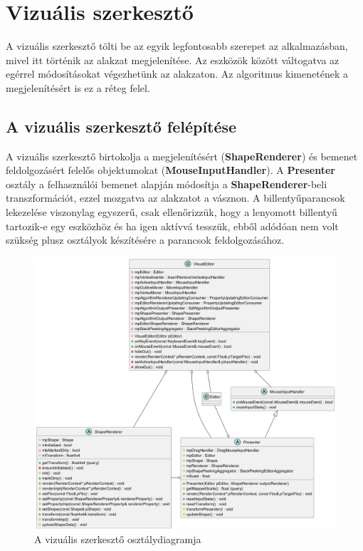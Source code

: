 \section{Vizuális szerkesztő}

A vizuális szerkesztő tölti be az egyik legfontosabb szerepet az alkalmazásban, mivel itt történik az alakzat megjelenítése. Az eszközök között váltogatva az egérrel módosításokat végezhetünk az alakzaton. Az algoritmus kimenetének a megjelenítésért is ez a réteg felel.

\subsection{A vizuális szerkesztő felépítése}

A vizuális szerkesztő birtokolja a megjelenítésért (\textbf{ShapeRenderer}) és bemenet feldolgozásért felelős objektumokat (\textbf{MouseInputHandler}). A \textbf{Presenter} osztály a felhasználói bemenet alapján módosítja a \textbf{ShapeRenderer}-beli transzformációt, ezzel mozgatva az alakzatot a vásznon. A billentyűparancsok lekezelése viszonylag egyszerű, csak ellenőrizzük, hogy a lenyomott billentyű tartozik-e egy eszközhöz és ha igen aktívvá tesszük, ebből adódóan nem volt szükség plusz osztályok készítésére a parancsok feldolgozásához.

\begin{figure}[H]
    \centering
    \includegraphics[width=1\linewidth]{images/class_visual_editor.png}
    \caption{A vizuális szerkesztő osztálydiagramja}
    \label{fig:class_visual_editor-1}
\end{figure}


